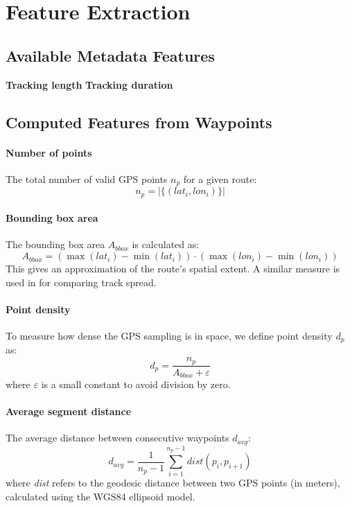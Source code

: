 \documentclass[a4paper,12pt,twoside]{scrreprt}
\begin{document}
\section{Feature Extraction}

\subsection{Available Metadata Features}

\textbf{Tracking length}
\textbf{Tracking duration}

\subsection{Computed Features from Waypoints}

\paragraph{Number of points}

The total number of valid GPS points $n_p$ for a given route:
\[
  n_p = |\{(lat_i, lon_i)\}|
\]

\paragraph{Bounding box area}

The bounding box area $A_{bbox}$ is calculated as:
\[
  A_{bbox} = (\max(lat_i) - \min(lat_i)) \cdot (\max(lon_i) - \min(lon_i))
\]
This gives an approximation of the route’s spatial extent. A similar measure is
used in \cite{yang2009spatial} for comparing track spread.

\paragraph{Point density}

To measure how dense the GPS sampling is in space, we define point density
$d_p$ as:
\[
  d_p = \frac{n_p}{A_{bbox} + \varepsilon}
\]
where $\varepsilon$ is a small constant to avoid division by zero.

\paragraph{Average segment distance}

The average distance between consecutive waypoints $d_{avg}$:
\[
  d_{avg} = \frac{1}{n_p - 1} \sum_{i=1}^{n_p - 1} dist(p_i, p_{i+1})
\]
where \textit{dist} refers to the geodesic distance between two GPS points (in
meters), calculated using the WGS84 ellipsoid model.
\end{document}
